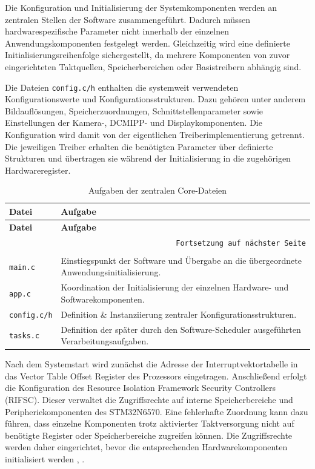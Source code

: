 Die Konfiguration und Initialisierung der Systemkomponenten werden an zentralen Stellen der Software zusammengeführt. Dadurch müssen hardwarespezifische Parameter nicht innerhalb der einzelnen Anwendungskomponenten festgelegt werden. Gleichzeitig wird eine definierte Initialisierungsreihenfolge sichergestellt, da mehrere Komponenten von zuvor eingerichteten Taktquellen, Speicherbereichen oder Basistreibern abhängig sind.

Die Dateien \texttt{config.c/h} enthalten die systemweit verwendeten Konfigurationswerte und Konfigurationsstrukturen. Dazu gehören unter anderem Bildauflösungen, Speicherzuordnungen, Schnittstellenparameter sowie Einstellungen der Kamera-, DCMIPP- und Displaykomponenten. Die Konfiguration wird damit von der eigentlichen Treiberimplementierung getrennt. Die jeweiligen Treiber erhalten die benötigten Parameter über definierte Strukturen und übertragen sie während der Initialisierung in die zugehörigen Hardwareregister.

\newpage

\begin{longtable}{|p{}|p{}|}
    \hline
    \textbf{Datei} & \textbf{Aufgabe} \\
    \hline
    \endfirsthead
    \hline
    \textbf{Datei} & \textbf{Aufgabe} \\
    \hline
    \endhead
    \hline
    \multicolumn{2}{r}{\texttt{Fortsetzung auf nächster Seite}} \\
    \endfoot
    \caption{Aufgaben der zentralen Core-Dateien}
    \label{tab:core-dateien} \\
    \endlastfoot
    \texttt{main.c} & Einstiegspunkt der Software und Übergabe an die übergeordnete Anwendungsinitialisierung. \\
    \hline
    \texttt{app.c} & Koordination der Initialisierung der einzelnen Hardware- und Softwarekomponenten. \\
    \hline
    \texttt{config.c/h} & Definition \& Instanziierung zentraler Konfigurationsstrukturen. \\
    \hline
    \texttt{tasks.c} & Definition der später durch den Software-Scheduler ausgeführten Verarbeitungsaufgaben. \\
    \hline
\end{longtable}

Nach dem Systemstart wird zunächst die Adresse der Interruptvektortabelle in das Vector Table Offset Register des Prozessors eingetragen. Anschließend erfolgt die Konfiguration des Resource Isolation Framework Security Controllers (RIFSC). Dieser verwaltet die Zugriffsrechte auf interne Speicherbereiche und Peripheriekomponenten des STM32N6570. Eine fehlerhafte Zuordnung kann dazu führen, dass einzelne Komponenten trotz aktivierter Taktversorgung nicht auf benötigte Register oder Speicherbereiche zugreifen können. Die Zugriffsrechte werden daher eingerichtet, bevor die entsprechenden Hardwarekomponenten initialisiert werden \cite{ResourceIsolationFramework}, \cite[S. 248 ff.]{rm0486}.

